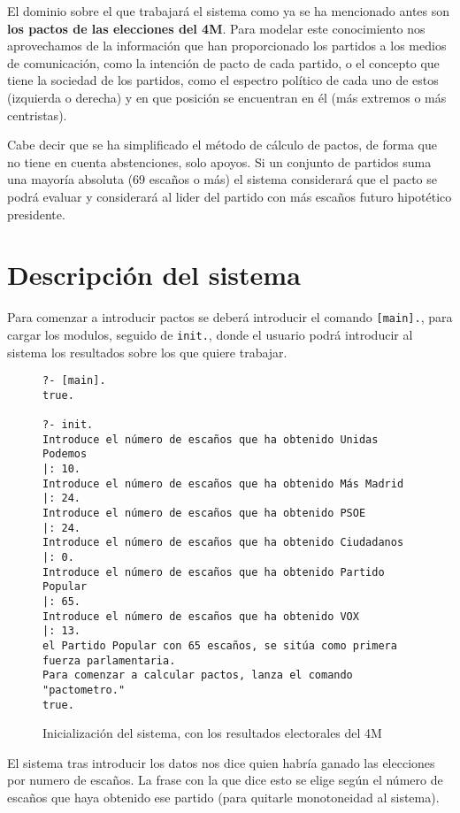 \documentclass[a4paper, 12pt]{article}
\begin{document}
		El dominio sobre el que trabajará el sistema como ya se ha mencionado 
	antes son \textbf{los pactos de las elecciones del 4M}. Para modelar este 
	conocimiento nos aprovechamos de la información que han proporcionado los
	partidos a los medios de comunicación, como la intención de pacto de cada
	partido, o el concepto que tiene la sociedad de los partidos, como el 
	espectro político de cada uno de estos (izquierda o derecha) y en que 
	posición se encuentran en él (más extremos o más centristas).

		Cabe decir que se ha simplificado el método de cálculo de pactos, de 
	forma que no tiene en cuenta abstenciones, solo apoyos. Si un conjunto de
	partidos suma una mayoría absoluta (69 escaños o más) el sistema considerará
	que el pacto se podrá evaluar y considerará al lider del partido con más 
	escaños futuro hipotético presidente.\\\mbox{}

	\section{Descripción del sistema}

		Para comenzar a introducir pactos se deberá introducir el comando 
	\texttt{[main].}, para cargar los modulos, seguido de \texttt{init.}, donde 
	el usuario podrá introducir al sistema los resultados sobre los que quiere 
	trabajar. 
	\begin{figure}[ht!]
		\begin{verbatim}
?- [main].
true.

?- init.
Introduce el número de escaños que ha obtenido Unidas Podemos
|: 10.
Introduce el número de escaños que ha obtenido Más Madrid
|: 24.
Introduce el número de escaños que ha obtenido PSOE
|: 24.
Introduce el número de escaños que ha obtenido Ciudadanos
|: 0.
Introduce el número de escaños que ha obtenido Partido Popular
|: 65.
Introduce el número de escaños que ha obtenido VOX
|: 13.
el Partido Popular con 65 escaños, se sitúa como primera fuerza parlamentaria.
Para comenzar a calcular pactos, lanza el comando "pactometro."
true.
		\end{verbatim}
		\caption{Inicialización del sistema, con los resultados electorales del
		4M}
		\label{f:init}
	\end{figure}

	El sistema tras introducir los datos nos dice quien habría ganado las 
elecciones por numero de escaños. La frase con la que dice esto se elige según 
el número de escaños que haya obtenido ese partido (para quitarle monotoneidad
al sistema).\\\mbox{}
\end{document}
